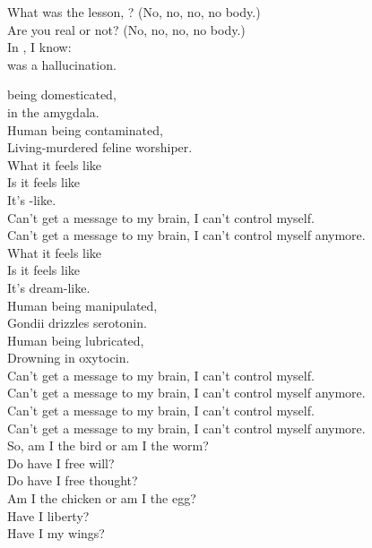 What was the lesson, ? (No, no, no, no body.) \\
Are you real or not? (No, no, no, no body.) \\

In , I know: \\
 was a hallucination. \\





 being domesticated, \\
 in the amygdala. \\
Human being contaminated, \\
Living-murdered feline worshiper. \\

What it feels like \\
Is it feels like \\
It's -like. \\

Can't get a message to my brain, I can't control myself. \\
Can't get a message to my brain, I can't control myself anymore. \\

What it feels like \\
Is it feels like \\
It's dream-like. \\

Human being manipulated, \\
Gondii drizzles serotonin. \\
Human being lubricated, \\
Drowning in oxytocin. \\

Can't get a message to my brain, I can't control myself. \\
Can't get a message to my brain, I can't control myself anymore. \\
Can't get a message to my brain, I can't control myself. \\
Can't get a message to my brain, I can't control myself anymore. \\

So, am I the bird or am I the worm? \\
Do have I free will? \\
Do have I free thought? \\
Am I the chicken or am I the egg? \\
Have I liberty? \\
Have I my wings? \\

